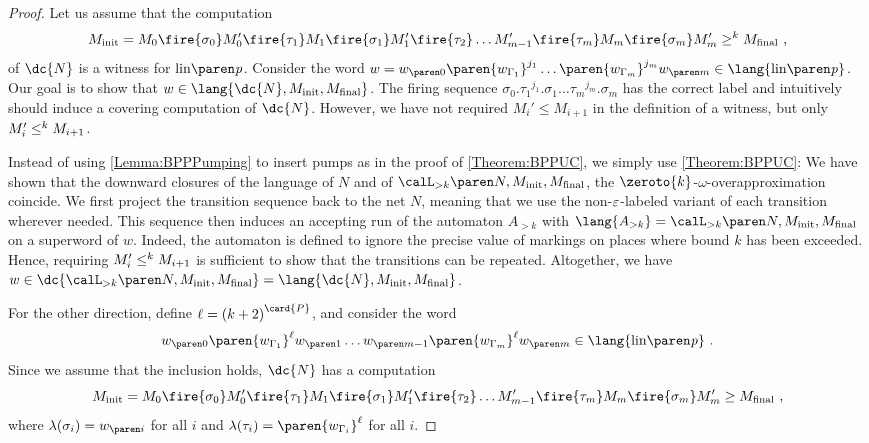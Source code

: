 \documentclass[../../diss.tex]{subfiles}
\begin{document}
\begin{proof}
    Let us assume that the computation
    \[
        \Minit
        =
        M_0 \fire{\sigma_0} M_0'
        \fire{\tau_1}
        M_1 \fire{\sigma_1} M_1'
        \fire{\tau_2}
        \ldots
        M_{m-1}'
        \fire{\tau_{m}}
        M_m \fire{\sigma_m} M_m'
        \geqk \Mfinal
        \ ,
    \]
    of $\mathmbox{\dc{N}}$ is a witness for $\linof{\product}$.
    Consider the word
    $w = \dtr{w}{0} \paren{w_{\Gamma_1}}^{j_1} \ldots \paren{w_{\Gamma_m}}^{j_m} \dtr{w}{m} \in \lang{\linof{\product}}$.
    Our goal is to show that $w \in \lang{\dc{N},\Minit,\Mfinal}$.
    The firing sequence $\sigma_0 . {\tau_1}^{j_1} . \sigma_1 \ldots {\tau_m}^{j_m} . \sigma_m$ has the correct label and intuitively should induce a covering computation of $\dc{N}$.
    However, we have not required $M_i'\leq M_{i+1}$ in the definition of a witness, but only $M_i'\leq^k M_{i+1}$.

    Instead of using \cref{Lemma:BPPPumping} to insert pumps as in the proof of \cref{Theorem:BPPUC}, we simply use \cref{Theorem:BPPUC}:
    We have shown that the downward closures of the language of $N$ and of $\langoak{k}{N,\Minit,\Mfinal}$, the $\zeroto{k}$-$\omega$-overapproximation coincide.
    We first project the transition sequence back to the net $N$, meaning that we use the non-$\varepsilon$-labeled variant of each transition wherever needed.
    This sequence then induces an accepting run of the automaton $A_{>k}$ with $\lang{A_{>k}} = \langoak{k}{N,\Minit,\Mfinal}$ on a superword of $w$.
    Indeed, the automaton is defined to ignore the precise value of markings on places where bound $k$ has been exceeded.
    Hence, requiring $M_i'\leq^k M_{i+1}$ is sufficient to show that the transitions can be repeated.
    Altogether, we have $w \in \dc{\langoak{k}{N,\Minit,\Mfinal}} = \lang{\dc{N},\Minit,\Mfinal}$.

    For the other direction, define $\ell = {(k+2)}^{\card{P}}$,
    and consider the word
    \[
        \dtr{w}{0} \paren{w_{\Gamma_1}}^{\ell} \dtr{w}{1} \ldots \dtr{w}{m-1} \paren{w_{\Gamma_m}}^{\ell} \dtr{w}{m}
        \in \lang{\linof{\product}}
        \ .
    \]
    Since we assume that the inclusion holds, $\dc{N}$ has a computation
    \[
        \Minit
        =
        M_0 \fire{\sigma_0} M_0'
        \fire{\tau_1}
        M_1 \fire{\sigma_1} M_1'
        \fire{\tau_2}
        \ldots
        M_{m-1}'
        \fire{\tau_{m}}
        M_m \fire{\sigma_m} M_m' \geq \Mfinal
        \ ,
    \]
    where $\lambda(\sigma_i) = \dtr{w}{i}$ for all $i$ and $\lambda(\tau_i) = \paren{w_{\Gamma_i}}^{\ell}$ for all $i$.


\end{proof}
\end{document}
